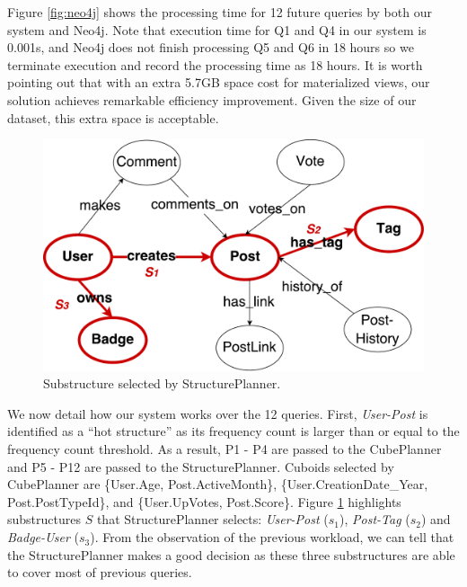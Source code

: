 Figure \ref{fig:neo4j} shows the processing time for 12 future queries by both our system and Neo4j. Note that execution time for Q1 and Q4 in our system is 0.001s, and Neo4j does not finish processing Q5 and Q6 in 18 hours so we terminate execution and record the processing time as 18 hours. It is worth pointing out that with an extra 5.7GB space cost for materialized views, our solution achieves remarkable efficiency improvement. Given the size of our dataset, this extra space is acceptable.

\begin{figure}[H]
	\centering
	\includegraphics[scale=0.37]{pic/expmetaS.pdf}
	\caption{Substructure selected by StructurePlanner.}
	\label{fig:metagraphexperimenthot}
\end{figure}

We now detail how our system works over the 12 queries. First, \textit{User-Post} is identified as a ``hot structure'' as its frequency count is larger than or equal to the frequency count threshold. As a result, P1 - P4 are passed to the CubePlanner and P5 - P12 are passed to the StructurePlanner. Cuboids selected by CubePlanner are \{User.Age, Post.ActiveMonth\}, \{User.CreationDate\_Year, Post.PostTypeId\}, and \{User.UpVotes, Post.Score\}. Figure \ref{fig:metagraphexperimenthot} highlights substructures $S$ that StructurePlanner selects:  \textit{User-Post} ($s_1$), \textit{Post-Tag} ($s_2$) and \textit{Badge-User} ($s_3$). From the observation of the previous workload, we can tell that the StructurePlanner makes a good decision as these three substructures are able to cover most of previous queries.

